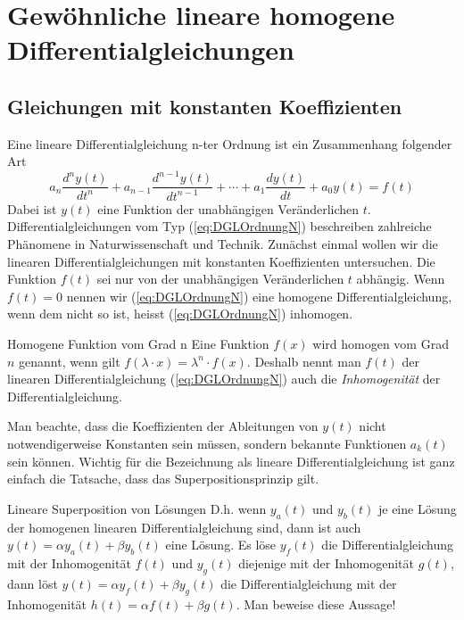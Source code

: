 \chapter{Gewöhnliche lineare homogene Differentialgleichungen}
\section{Gleichungen mit konstanten Koeffizienten}
Eine lineare Differentialgleichung n-ter Ordnung ist ein Zusammenhang folgender
Art
\begin{equation}\label{eq:DGLOrdnungN}
a_n\frac{d^n y(t)}{dt^n}+a_{n-1}\frac{d^{n-1} y(t)}{dt^{n-1}}+
\cdots +a_{1}\frac{d y(t)}{dt}+a_0y(t)=f(t)
\end{equation}
Dabei ist $y(t)$ eine Funktion der unabhängigen Veränderlichen $t$.
Differentialgleichungen vom Typ (\ref{eq:DGLOrdnungN}) beschreiben zahlreiche
Phänomene in Naturwissenschaft und Technik. Zunächst einmal wollen wir die
linearen Differentialgleichungen mit konstanten Koeffizienten untersuchen. Die Funktion $f(t)$ sei nur von der unabhängigen Veränderlichen $t$ ab\-hängig. Wenn $f(t)=0$ nennen wir (\ref{eq:DGLOrdnungN}) eine homogene Differentialgleichung, wenn dem nicht so ist, heisst (\ref{eq:DGLOrdnungN}) inhomogen.
\begin{note}{Homogene Funktion vom Grad n}
  Eine Funktion $f(x)$ wird homogen vom Grad $n$ genannt, wenn gilt $f(\lambda\cdot x)=\lambda^n\cdot f(x)$. Deshalb nennt man $f(t)$ der linearen Differentialgleichung (\ref{eq:DGLOrdnungN}) auch die \textit{Inhomogenität} der Differentialgleichung.
\end{note}

Man beachte, dass die Koeffizienten der Ableitungen von $y(t)$ nicht
notwendigerweise Konstanten sein müssen, sondern bekannte Funktionen $a_k(t)$
sein können. Wichtig für die Bezeichnung als lineare Differentialgleichung ist
ganz einfach die Tatsache, dass das Superpositionsprinzip gilt. 
\begin{note}{Lineare Superposition von Lösungen}
D.h. wenn $y_a(t)$ und $y_b(t)$ je eine Lösung der homogenen linearen
Differentialgleichung sind, dann ist auch $y(t)=\alpha y_a(t) + \beta y_b(t)$
eine Lösung. Es löse $y_f(t)$ die Differentialgleichung mit der Inhomogenität
$f(t)$ und $y_g(t)$ diejenige mit der Inhomogenität $g(t)$, dann löst
$y(t)=\alpha y_f(t) + \beta y_g(t)$ die Differentialgleichung mit der
Inhomogenität $h(t)=\alpha f(t) + \beta g(t)$. Man beweise diese Aussage!
\end{note}
%
